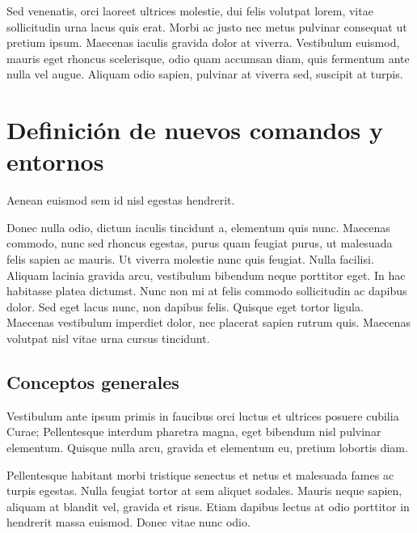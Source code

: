 \documentclass[12pt,a4paper]{report}
\begin{document}
Sed venenatis, orci laoreet ultrices molestie, dui felis volutpat lorem, vitae sollicitudin urna lacus quis erat. Morbi ac justo nec metus pulvinar consequat ut pretium ipsum. Maecenas iaculis gravida dolor at viverra. Vestibulum euismod, mauris eget rhoncus scelerisque, odio quam accumsan diam, quis fermentum ante nulla vel augue. Aliquam odio sapien, pulvinar at viverra sed, suscipit at turpis. 








\chapter{Definición de nuevos comandos y entornos}
\label{tema.nuevoscomandos}



Aenean euismod sem id nisl egestas hendrerit.

Donec nulla odio, dictum iaculis tincidunt a, elementum quis nunc. Maecenas commodo, nunc sed rhoncus egestas, purus quam feugiat purus, ut malesuada felis sapien ac mauris. Ut viverra molestie nunc quis feugiat. Nulla facilisi. Aliquam lacinia gravida arcu, vestibulum bibendum neque porttitor eget. In hac habitasse platea dictumst. Nunc non mi at felis commodo sollicitudin ac dapibus dolor. Sed eget lacus nunc, non dapibus felis. Quisque eget tortor ligula. Maecenas vestibulum imperdiet dolor, nec placerat sapien rutrum quis. Maecenas volutpat nisl vitae urna cursus tincidunt. 





\section{Conceptos generales}
\label{seccion.conceptos}



Vestibulum ante ipsum primis in faucibus orci luctus et ultrices posuere cubilia Curae; Pellentesque interdum pharetra magna, eget bibendum nisl pulvinar elementum. Quisque nulla arcu, gravida et elementum eu, pretium lobortis diam.

Pellentesque habitant morbi tristique senectus et netus et malesuada fames ac turpis egestas. Nulla feugiat tortor at sem aliquet sodales. Mauris neque sapien, aliquam at blandit vel, gravida et risus. Etiam dapibus lectus at odio porttitor in hendrerit massa euismod. Donec vitae nunc odio. 
\end{document}
